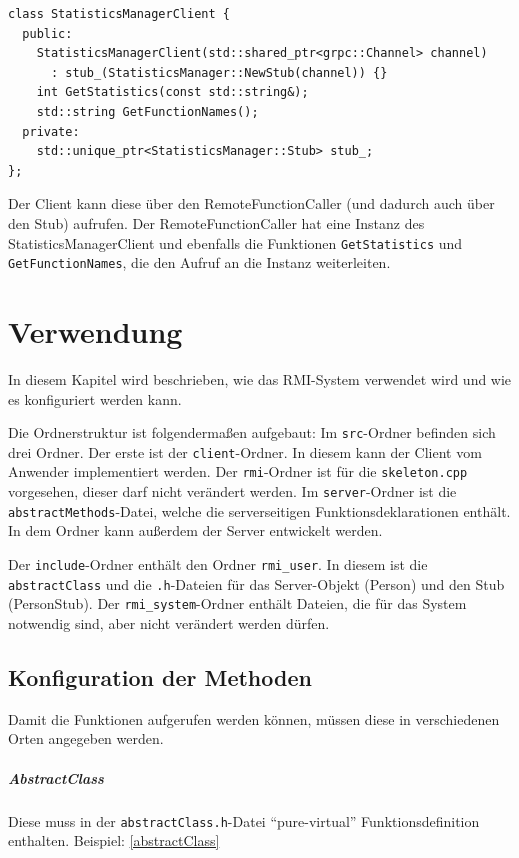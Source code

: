 \documentclass[a4paper,oneside,10pt]{report}
\begin{document}
\begin{lstlisting}
class StatisticsManagerClient {
  public: 
    StatisticsManagerClient(std::shared_ptr<grpc::Channel> channel)
      : stub_(StatisticsManager::NewStub(channel)) {}
    int GetStatistics(const std::string&);
    std::string GetFunctionNames();
  private:
    std::unique_ptr<StatisticsManager::Stub> stub_;
};
\end{lstlisting}

Der Client kann diese über den RemoteFunctionCaller (und dadurch auch über den Stub) aufrufen. Der RemoteFunctionCaller hat eine Instanz des StatisticsManagerClient und ebenfalls die Funktionen \texttt{GetStatistics} und \texttt{GetFunctionNames}, die den Aufruf an die Instanz weiterleiten. 

\chapter{Verwendung} \label{verwendung}

In diesem Kapitel wird beschrieben, wie das RMI-System verwendet wird und wie es konfiguriert werden kann. 

Die Ordnerstruktur ist folgendermaßen aufgebaut: Im \texttt{src}-Ordner befinden sich drei Ordner. Der erste ist der \texttt{client}-Ordner. In diesem kann der Client vom Anwender implementiert werden. Der \texttt{rmi}-Ordner ist für die \texttt{skeleton.cpp} vorgesehen, dieser darf nicht verändert werden. Im \texttt{server}-Ordner ist die \texttt{abstractMethods}-Datei, welche die serverseitigen Funktionsdeklarationen enthält. In dem Ordner kann außerdem der Server entwickelt werden. 

Der \texttt{include}-Ordner enthält den Ordner \texttt{rmi\_user}. In diesem ist die \texttt{abstractClass} und die \texttt{.h}-Dateien für das Server-Objekt (Person) und den Stub (PersonStub). Der \texttt{rmi\_system}-Ordner enthält Dateien, die für das System notwendig sind, aber nicht verändert werden dürfen. 

\section{Konfiguration der Methoden}

Damit die Funktionen aufgerufen werden können, müssen diese in verschiedenen Orten angegeben werden. 


\paragraph{AbstractClass} Diese muss in der \texttt{abstractClass.h}-Datei "`pure-virtual"' Funktionsdefinition enthalten. Beispiel: \ref{abstractClass}
\end{document}
